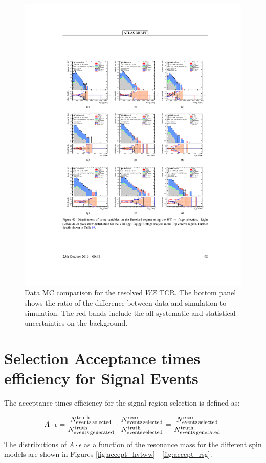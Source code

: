 \begin{figure}[h!]
  \centering
  \includegraphics[width=\hsize , height=\textheight , keepaspectratio]{figures/Analysis/datamc/resolved_wz_tcr.pdf}
      \caption{Data MC comparison for the resolved $WZ$ TCR. The bottom panel shows the ratio of the difference between data and simulation to simulation. The red bands include the all systematic and statistical uncertainties on the background. } 
  \label{fig:resolved_wz_TCR_datamc}
\end{figure} 
\FloatBarrier

\section{Selection Acceptance times efficiency for Signal Events}
The acceptance times efficiency for the signal region selection is defined as:

\begin{equation}
A \cdot \epsilon = \frac{N^{\mathrm{truth}}_{\mathrm{events\, selected}}}{N^{\mathrm{truth}}_{\mathrm{events\, generated}}} \cdot \frac{N^{\mathrm{reco}}_{\mathrm{events\, selected}}}{N^{\mathrm{truth}}_{\mathrm{events\, selected}}}
\\
= \frac{N^{\mathrm{reco}}_{\mathrm{events\, selected}}}{N^{\mathrm{truth}}_{\mathrm{events\, generated}}}
\end{equation}
The distributions of $A\cdot \epsilon$ as a function of the resonance mass for the different spin models are shown in Figures \ref{fig:accept_hvtww} - \ref{fig:accept_rsg}.

